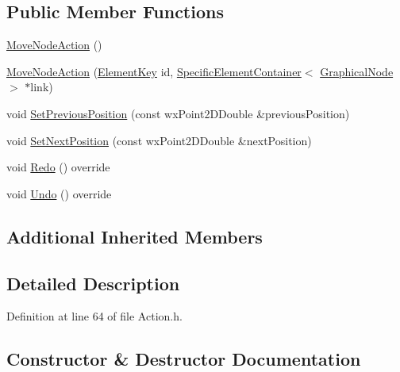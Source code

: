 \subsection*{Public Member Functions}
\begin{DoxyCompactItemize}
\item 
\hyperlink{class_move_node_action_ac44ca7328f395af83bd4941644943a85}{Move\+Node\+Action} ()
\item 
\hyperlink{class_move_node_action_a7c2da694794d2637be3b92fd0667445f}{Move\+Node\+Action} (\hyperlink{_graphical_element_8h_ade5fd6c85839a416577ff9de1605141e}{Element\+Key} id, \hyperlink{class_specific_element_container}{Specific\+Element\+Container}$<$ \hyperlink{class_graphical_node}{Graphical\+Node} $>$ $\ast$link)
\item 
void \hyperlink{class_move_node_action_a70dcb3f48867ce7b5d57c9d15794984a}{Set\+Previous\+Position} (const wx\+Point2\+D\+Double \&previous\+Position)
\item 
void \hyperlink{class_move_node_action_a84fd47d3f670edfc79c089d5efb6daca}{Set\+Next\+Position} (const wx\+Point2\+D\+Double \&next\+Position)
\item 
void \hyperlink{class_move_node_action_ae73d7a16920641dcc5b83f671e287223}{Redo} () override
\item 
void \hyperlink{class_move_node_action_ad2136c2037da52ba1417c0c44b28d579}{Undo} () override
\end{DoxyCompactItemize}
\subsection*{Additional Inherited Members}


\subsection{Detailed Description}


Definition at line 64 of file Action.\+h.



\subsection{Constructor \& Destructor Documentation}
\mbox{\label{class_move_node_action_ac44ca7328f395af83bd4941644943a85}} 
